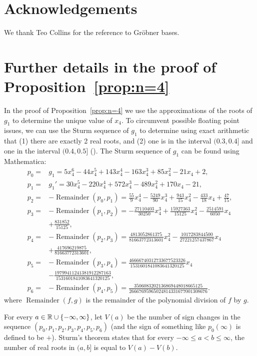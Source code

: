 \documentclass[preprint,12pt,authoryear]{elsarticle}
\newcommand{\R}{\mathbb{R}}
\DeclarePairedDelimiter{\ios}{\{}{\}}
\newcommand{\s}{\ios*}
\DeclareMathOperator*{\remn}{Remainder}
\begin{document}
\section*{Acknowledgements}
We thank Teo Collins for the reference to Gr\"obner bases.



\appendix



\section{Further details in the proof of Proposition~\ref{prop:n=4}}\label{app:sturm}

In the proof of Proposition~\ref{prop:n=4} we use the approximations of the roots of $g_1$ to determine the unique value of $x_4$. To circumvent possible floating point issues, we can use the Sturm sequence of $g_1$ to determine using exact arithmetic that (1) there are exactly 2 real roots, and (2) one is in the interval $(0.3,0.4]$ and one in the interval $(0.4,0.5]$ (\cite{sturm1835memoire}). The Sturm sequence of $g_1$ can be found using Mathematica:
\begin{align*}
    p_0=&g_1=5x_4^6-44x_4^5+143x_4^4-163x_4^3+85x_4^2-21x_4+2,\\
    p_1=&g_1'=30x_4^5-220x_4^4+572x_4^3-489x_4^2+170x_4-21,\\
    p_2=&-\remn(p_0,p_1)=\frac{55}{9}x_4^4-\frac{5249}{90}x_4^3+\frac{943}{15}x_4^2-\frac{433}{18}x_4+\frac{47}{15},\\
    p_3=&-\remn(p_1,p_2)=-\frac{27110403}{30250}x_4^3+\frac{15927363}{15125}x_4^2-\frac{2514591}{6050}x_4\\
    &+\frac{831852}{15125},\\
    p_4=&-\remn(p_2,p_3)=\frac{4813052861375}{81663772313601}x_4^2-\frac{1017283844500}{27221257437867}x_4\\
    &+\frac{417696219875}{81663772313601},\\
    p_5=&-\remn(p_3,p_4)=\frac{46666740312733677523326}{1531601841083641320125}x_4\\
    &-\frac{19799411241381912287163}{1531601841083641320125},\\
    p_6=&-\remn(p_4,p_5)=\frac{3506083202136869448018665125}{26667695965024814331677001308676}.
\end{align*}
where $\remn(f,g)$ is the remainder of the polynomial division of $f$ by $g$.

For every $a\in\R\cup\s{-\infty,\infty}$, let $V(a)$ be the number of sign changes in the sequence $(p_0,p_1,p_2,p_3,p_4,p_5,p_6)$ (and the sign of something like $p_0(\infty)$ is defined to be $+$). Sturm's theorem states that for every $-\infty\le a<b\le\infty$, the number of real roots in $(a,b]$ is equal to $V(a)-V(b)$.
\end{document}

